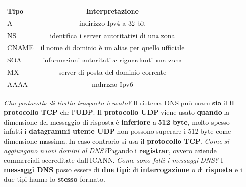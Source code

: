 \documentclass[11pt,a4paper]{article}
\theoremstyle{definition}
\begin{document}
\begin{table}[h!]
	\begin{center}
		\label{tab:table1}
		\begin{tabular}{l|c|r}
			\textbf{Tipo} & \textbf{Interpretazione}                           \\
			\hline
			A             & indirizzo Ipv4 a 32 bit                            \\
			NS            & identifica i server autoritativi di una zona       \\
			CNAME         & il nome di dominio è un alias per quello ufficiale \\
			SOA           & informazioni autoritative riguardanti una zona     \\
			MX            & server di posta del dominio
			corrente                                                           \\
			AAAA          & indirizzo Ipv6                                     \\
		\end{tabular}
	\end{center}
\end{table}\newline
\textit{Che protocollo di livello trasporto è usato?}\newline\newline
Il sistema DNS può usare \textbf{sia} il \textbf{il protocollo TCP} che l'\textbf{UDP}.
Il \textbf{protocollo UDP} viene usato \textbf{quando} la dimensione del messaggio di risposta è \textbf{inferiore} a\textbf{ 512 byte}, molto spesso infatti i \textbf{datagrammi utente UDP} non possono superare i 512 byte come dimensione massima. In caso contrario si usa il \textbf{protocollo TCP}.\newline\newline
\textit{Come si aggiungono nuovi domini al DNS?}\newline\newline Pagando i \textbf{registrar}, ovvero aziende commerciali accreditate dall'ICANN.\newpage
\textit{Come sono fatti i messaggi DNS?}\newline\newline
I \textbf{messaggi DNS} posso essere di \textbf{due tipi}: di \textbf{interrogazione} o di \textbf{risposta} e i due tipi hanno lo \textbf{stesso} formato.
\end{document}
